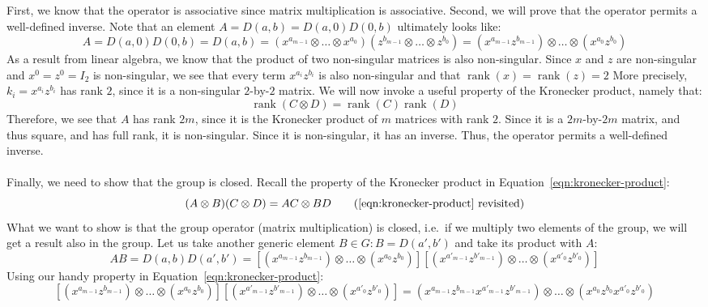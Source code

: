 \documentclass[letterpaper]{article}
\DeclareMathOperator{\rank}{rank}
\begin{document}
First, we know that the operator is associative since matrix multiplication is associative.
Second, we will prove that the operator permits a well-defined inverse.
Note that an element $ A = D(a,b) = D(a,0)D(0,b) $ ultimately looks like:
\[
A = D(a,0)D(0,b) = D(a,b) = (x^{a_{m - 1}} \otimes \ldots \otimes x^{a_{0}}) (z^{b_{m - 1}} \otimes \ldots \otimes z^{b_{0}}) = (x^{a_{m - 1}} z^{b_{m - 1}}) \otimes \ldots \otimes  (x^{a_{0}} z^{b_{0}})
\]
As a result from linear algebra, we know that the product of two non-singular matrices is also non-singular.
Since $ x $ and $ z $ are non-singular and $ x^0 = z^0 = I_2 $ is non-singular, we see that every term $ x^{a_i} z^{b_i} $ is also non-singular and that $ \rank{(x)} = \rank{(z)} = 2 $
More precisely, $ k_i = x^{a_i} z^{b_i} $ has rank $ 2 $, since it is a non-singular $ 2 $-by-$ 2 $ matrix.
We will now invoke a useful property of the Kronecker product, namely that:
$$ \rank{(C \otimes D)} = \rank{(C)}\rank{(D)} $$
Therefore, we see that $ A $ has rank $ 2m $, since it is the Kronecker product of $ m $ matrices with rank $ 2 $.
Since it is a $ 2m $-by-$ 2m $ matrix, and thus square, and has full rank, it is non-singular.
Since it is non-singular, it has an inverse.
Thus, the operator permits a well-defined inverse.
\\ \\
Finally, we need to show that the group is closed.
Recall the property of the Kronecker product in Equation~\ref{eqn:kronecker-product}:
\begin{equation}
(A \otimes B) (C \otimes D) = AC \otimes BD
\tag{\ref{eqn:kronecker-product} revisited}
\end{equation}
What we want to show is that the group operator (matrix multiplication) is closed, i.e.\ if we multiply two elements of the group, we will get a result also in the group.
Let us take another generic element $ B \in G : B = D(a', b') $ and take its product with $ A $:
\[
AB = D(a,b)D(a',b') = \left[(x^{a_{m - 1}} z^{b_{m - 1}}) \otimes \ldots \otimes (x^{a_{0}} z^{b_{0}}) \right] \left[(x^{a'_{m - 1}} z^{b'_{m - 1}}) \otimes \ldots \otimes  (x^{a'_{0}} z^{b'_{0}}) \right]
\]
Using our handy property in Equation~\ref{eqn:kronecker-product}:
\begin{equation}
\label{eqn:kron-ab-expansion}
    \left[(x^{a_{m - 1}} z^{b_{m - 1}}) \otimes \ldots \otimes (x^{a_{0}} z^{b_{0}}) \right] \left[(x^{a'_{m - 1}} z^{b'_{m - 1}}) \otimes \ldots \otimes  (x^{a'_{0}} z^{b'_{0}}) \right] = (x^{a_{m - 1}} z^{b_{m - 1}} x^{a'_{m - 1}} z^{b'_{m - 1}}) \otimes \ldots \otimes (x^{a_{0}} z^{b_{0}} x^{a'_{0}} z^{b'_{0}})
\end{equation}
\end{document}
